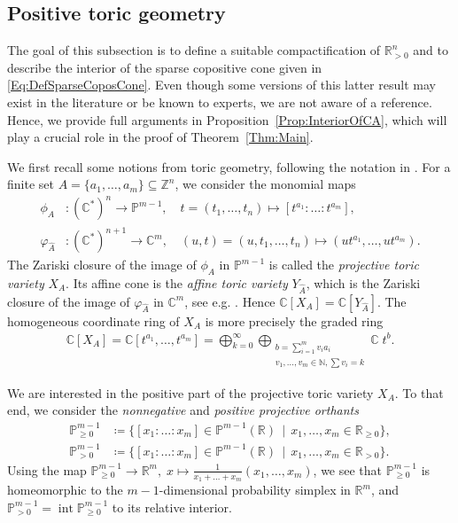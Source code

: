 \documentclass[a4paper,11pt]{amsart}
\theoremstyle{definition}
\DeclareMathOperator{\interior}{int}
\newcommand{\RR}{\mathbb{R}}
\newcommand{\CC}{\mathbb{C}}
\newcommand{\PP}{\mathbb{P}}
\begin{document}
\subsection{Positive toric geometry}
\label{Sec:PosToricGeom}
The goal of this subsection is to define a suitable compactification of $\mathbb{R}^n_{>0}$ and to describe the interior of the sparse copositive cone given in \eqref{Eq:DefSparseCoposCone}.
Even though some versions of this latter result may exist in the literature or be known to experts, we are not aware of a reference. Hence, we provide full arguments in Proposition~\ref{Prop:InteriorOfCA}, which will play a crucial role in the proof of Theorem~\ref{Thm:Main}.

We first recall some notions from toric geometry, following the notation in \cite{telen2022introductiontoricgeometry,TelenBook}.
For a finite set $A = \{ a_1, \dots , a_m\} \subseteq \mathbb{Z}^n$, we consider the monomial maps
\begin{equation}
    \label{Eq:MonomialMap}
\begin{aligned}
\phi_A &\colon (\mathbb{C}^*)^n \to \mathbb{P}^{m-1}, \quad t=(t_1,\dots,t_n) \mapsto [t^{a_1}\colon \dots \colon t^{a_m}],\\
\varphi_{\hat{A}}&\colon (\mathbb{C}^*)^{n+1} \to \mathbb{C}^{m}, \quad (u,t) = (u,t_1,\dots,t_n) \mapsto (u t^{a_1}, \dots , u t^{a_m}).
\end{aligned}
\end{equation}
The Zariski closure of the image of $\phi_A$ in $\mathbb{P}^{m-1}$ is called the \emph{projective toric variety} $X_A$.
Its affine cone is the \emph{affine toric variety} $Y_{\hat{A}}$, which is the Zariski closure of the image of $\varphi_{\hat{A}}$ in $\mathbb{C}^m$, see e.g. \cite[Proposition 3.7]{telen2022introductiontoricgeometry}.
Hence $\CC[X_A] = \CC[Y_{\hat{A}}]$.
The homogeneous coordinate ring of $X_A$ is more precisely the graded ring
\begin{align}
\label{Eq:CoordinateRingXA}
    \mathbb{C}[X_A] = \mathbb{C}[t^{a_1}, \dots , t^{a_m}] = \bigoplus_{k=0}^\infty \bigoplus_{ \substack{b = \sum_{i=1}^m v_ia_i \\ v_1, \dots, v_m \in \mathbb{N}, \sum v_i = k }} \mathbb{C} \; t^b.
\end{align}


We are interested in the positive part of the projective toric variety $X_A$.
To that end, we consider the \emph{nonnegative} and \emph{positive projective orthants}
\begin{align*}
    \mathbb{P}^{m-1}_{\geq 0} &\coloneqq \{  [x_1 \colon \dots \colon x_m] \in \mathbb{P}^{m-1}(\RR) \, \mid \, x_1, \dots, x_m \in \mathbb{R}_{\geq0}  \},\\
    \mathbb{P}^{m-1}_{> 0}  & \coloneqq \{  [x_1 \colon \dots \colon x_m] \in \mathbb{P}^{m-1}(\RR) \, \mid \, x_1, \dots, x_m \in \mathbb{R}_{>0}  \}.
\end{align*}
Using the map $\PP^{m-1}_{\geq 0} \to \RR^m, \; x \mapsto \tfrac{1}{x_1+ \dots +x_m}(x_1, \dots, x_m)$, we see that $\mathbb{P}^{m-1}_{\geq 0} $ is homeomorphic to the $m-1$-dimensional probability simplex in $\RR^m$, and $\mathbb{P}_{>0}^{m-1} = \interior \PP^{m-1}_{\geq 0}$ to its relative interior.
\end{document}
